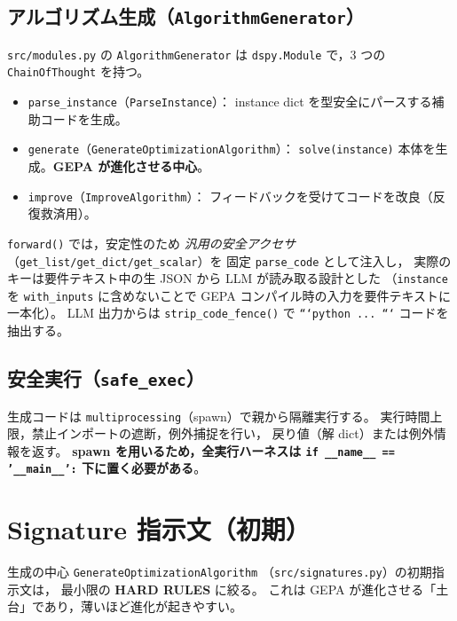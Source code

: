 \documentclass[uplatex,dvipdfmx,a4paper,11pt]{jsarticle}
\begin{document}
\subsection{アルゴリズム生成（\texttt{AlgorithmGenerator}）}

\texttt{src/modules.py} の \texttt{AlgorithmGenerator} は
\texttt{dspy.Module} で，3 つの \texttt{ChainOfThought} を持つ。

\begin{itemize}
  \item \texttt{parse\_instance}（\texttt{ParseInstance}）：
    instance dict を型安全にパースする補助コードを生成。
  \item \texttt{generate}（\texttt{GenerateOptimizationAlgorithm}）：
    \texttt{solve(instance)} 本体を生成。\textbf{GEPA が進化させる中心}。
  \item \texttt{improve}（\texttt{ImproveAlgorithm}）：
    フィードバックを受けてコードを改良（反復救済用）。
\end{itemize}

\texttt{forward()} では，安定性のため
\emph{汎用の安全アクセサ}（\texttt{get\_list/get\_dict/get\_scalar}）を
固定 \texttt{parse\_code} として注入し，
実際のキーは要件テキスト中の生 JSON から LLM が読み取る設計とした
（\texttt{instance} を \texttt{with\_inputs} に含めないことで
GEPA コンパイル時の入力を要件テキストに一本化）。
LLM 出力からは \texttt{strip\_code\_fence()} で
\texttt{```python ... ```} コードを抽出する。

\subsection{安全実行（\texttt{safe\_exec}）}

生成コードは \texttt{multiprocessing}（spawn）で親から隔離実行する。
実行時間上限，禁止インポートの遮断，例外捕捉を行い，
戻り値（解 dict）または例外情報を返す。
\textbf{spawn を用いるため，全実行ハーネスは
\texttt{if \_\_name\_\_ == '\_\_main\_\_':} 下に置く必要がある}。

\section{Signature 指示文（初期）}\label{sec:sig}

生成の中心 \texttt{GenerateOptimizationAlgorithm}
（\texttt{src/signatures.py}）の初期指示文は，
最小限の \textbf{HARD RULES} に絞る。
これは GEPA が進化させる「土台」であり，薄いほど進化が起きやすい。
\end{document}
